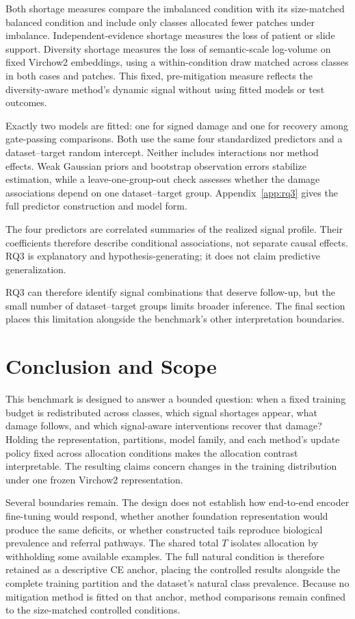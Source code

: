 \documentclass[11pt]{article}
\begin{document}
Both shortage measures compare the imbalanced condition with its size-matched balanced condition and include only classes allocated fewer patches under imbalance. Independent-evidence shortage measures the loss of patient or slide support. Diversity shortage measures the loss of semantic-scale log-volume on fixed Virchow2 embeddings, using a within-condition draw matched across classes in both cases and patches. This fixed, pre-mitigation measure reflects the diversity-aware method's dynamic signal without using fitted models or test outcomes.

Exactly two models are fitted: one for signed damage and one for recovery among gate-passing comparisons. Both use the same four standardized predictors and a dataset--target random intercept. Neither includes interactions nor method effects. Weak Gaussian priors and bootstrap observation errors stabilize estimation, while a leave-one-group-out check assesses whether the damage associations depend on one dataset--target group. Appendix~\ref{app:rq3} gives the full predictor construction and model form.

The four predictors are correlated summaries of the realized signal profile. Their coefficients therefore describe conditional associations, not separate causal effects. RQ3 is explanatory and hypothesis-generating; it does not claim predictive generalization.

RQ3 can therefore identify signal combinations that deserve follow-up, but the small number of dataset--target groups limits broader inference. The final section places this limitation alongside the benchmark's other interpretation boundaries.

\section{Conclusion and Scope}
\label{sec:limits}
This benchmark is designed to answer a bounded question: when a fixed training budget is redistributed across classes, which signal shortages appear, what damage follows, and which signal-aware interventions recover that damage? Holding the representation, partitions, model family, and each method's update policy fixed across allocation conditions makes the allocation contrast interpretable. The resulting claims concern changes in the training distribution under one frozen Virchow2 representation.

Several boundaries remain. The design does not establish how end-to-end encoder fine-tuning would respond, whether another foundation representation would produce the same deficits, or whether constructed tails reproduce biological prevalence and referral pathways. The shared total $T$ isolates allocation by withholding some available examples. The full natural condition is therefore retained as a descriptive CE anchor, placing the controlled results alongside the complete training partition and the dataset's natural class prevalence. Because no mitigation method is fitted on that anchor, method comparisons remain confined to the size-matched controlled conditions.
\end{document}
